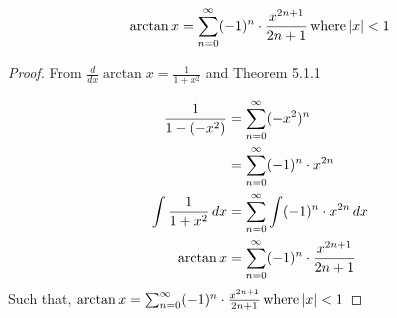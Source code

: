 \begin{lemma}
  \[
    \arctan{x} = \sum_{n=0}^{\infty} (-1)^n \cdot \frac{x^{2n+1}}{2n+1} \, \mathrm{where} \, |x| < 1
  \]
\end{lemma}

\begin{proof}
  From \(\frac{d}{dx} \arctan{x} = \frac{1}{1+x^2}\) and Theorem 5.1.1

  \begin{equation}
    \nonumber
    \begin{aligned}
      \frac{1}{1 - (-x^2)} &= \sum_{n=0}^{\infty} (-x^2)^n \\
      &= \sum_{n=0}^{\infty} (-1)^n \cdot x^{2n} \\
      \int \frac{1}{1 + x^2} \, dx &= \sum_{n=0}^{\infty} \int (-1)^n \cdot x^{2n} \, dx \\
      \arctan{x} &= \sum_{n=0}^{\infty} (-1)^n \cdot \frac{x^{2n+1}}{2n+1}
    \end{aligned}
  \end{equation}
  Such that, \(\arctan{x} = \sum_{n=0}^{\infty} (-1)^n \cdot \frac{x^{2n+1}}{2n+1} \, \mathrm{where} \, |x| < 1 \)
\end{proof}

